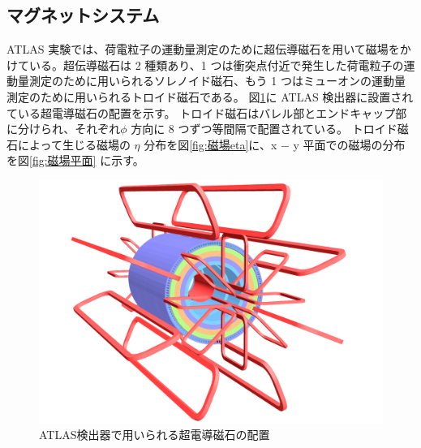 \subsection{マグネットシステム}\label{magnetic_filed}
ATLAS 実験では、荷電粒子の運動量測定のために超伝導磁石を用いて磁場をかけている。超伝導磁石は 2 種類あり、1 つは衝突点付近で発生した荷電粒子の運動量測定のために用いられるソレノイド磁石、もう 1 つはミューオンの運動量測定のために用いられるトロイド磁石である。
図\ref{fig:磁石}に ATLAS 検出器に設置されている超電導磁石の配置を示す。
トロイド磁石はバレル部とエンドキャップ部に分けられ、それぞれ$\phi$ 方向に 8 つずつ等間隔で配置されている。
トロイド磁石によって生じる磁場の $\eta$ 分布を図\ref{fig:磁場eta}に、x − y 平面での磁場の分布を図\ref{fig:磁場平面} に示す。

\begin{figure}[tb]
  \centering
  \includegraphics[clip, width=14cm]{fig/2/ATLcoilGeom.pdf}
  \caption{ATLAS検出器で用いられる超電導磁石の配置}
  \label{fig:磁石}
\end{figure}

